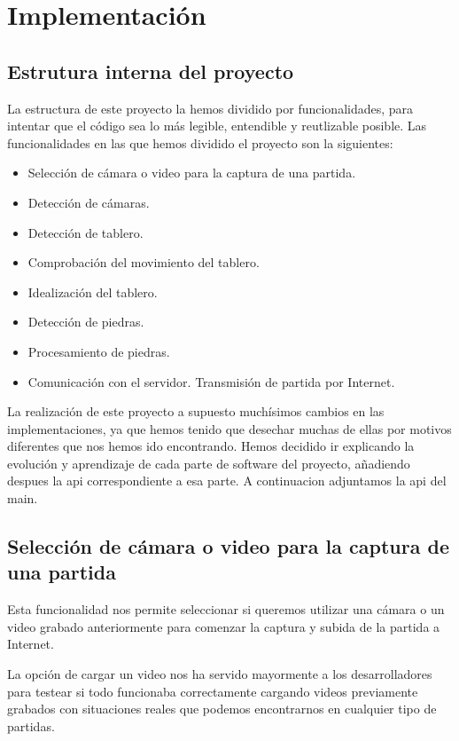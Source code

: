 \documentclass[12pt,a4paper]{report}
\begin{document}
\chapter{Implementación}

\section{Estrutura interna del proyecto}

La estructura de este proyecto la hemos dividido por funcionalidades, para
intentar que el código sea lo más legible, entendible y reutlizable posible. Las
funcionalidades en las que hemos dividido el proyecto son la siguientes:
\begin{itemize} 
    \item Selección de cámara o video para la captura de una partida.
    \item Detección de cámaras. 
    \item Detección de tablero.
    \item Comprobación del movimiento del tablero.
    \item Idealización del tablero.
    \item Detección de piedras.
    \item Procesamiento de piedras. 
    \item Comunicación con el servidor. Transmisión de partida por Internet.
\end{itemize}

La realización de este proyecto a supuesto muchísimos cambios en las
implementaciones, ya que hemos tenido que desechar muchas de ellas por motivos
diferentes que nos hemos ido encontrando. Hemos decidido ir explicando la
evolución y aprendizaje de cada parte de software del proyecto, añadiendo
despues la api correspondiente a esa parte. A continuacion adjuntamos la api del
main.



\section{Selección de cámara o video para la captura de una partida} 

Esta funcionalidad nos permite seleccionar si queremos utilizar una cámara o un
video grabado anteriormente para comenzar la captura y subida de la partida a
Internet.

La opción de cargar un video nos ha servido mayormente a los desarrolladores
para testear si todo funcionaba correctamente cargando videos previamente
grabados con situaciones reales que podemos encontrarnos en cualquier tipo de
partidas. 
\end{document}
